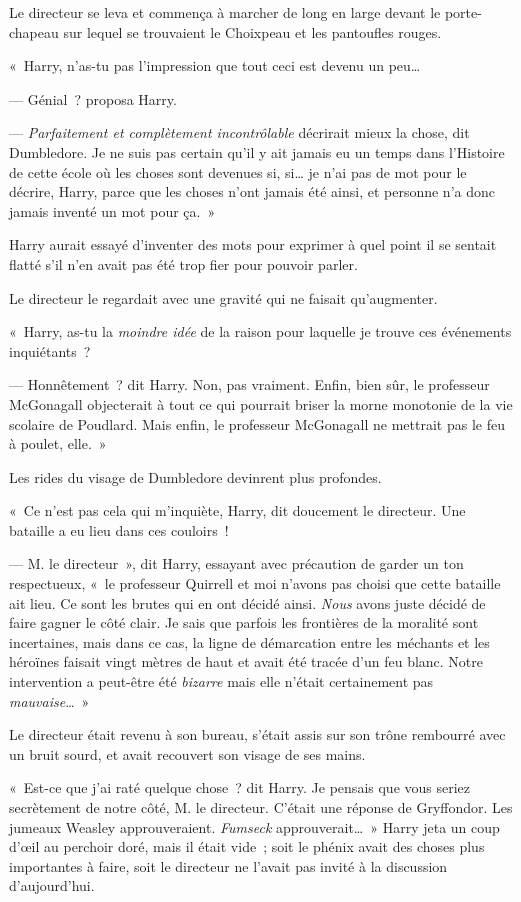 Le directeur se leva et commença à marcher de long en large devant le porte-chapeau sur lequel se trouvaient le Choixpeau et les pantoufles rouges.

«~Harry, n'as-tu pas l'impression que tout ceci est devenu un peu…

--- Génial~? proposa Harry.

--- \emph{Parfaitement et complètement incontrôlable} décrirait mieux la chose, dit Dumbledore.
Je ne suis pas certain qu'il y ait jamais eu un temps dans l'Histoire de cette école où les choses sont devenues si, si… je n'ai pas de mot pour le décrire, Harry, parce que les choses n'ont jamais été ainsi, et personne n'a donc jamais inventé un mot pour ça.~»

Harry aurait essayé d'inventer des mots pour exprimer à quel point il se sentait flatté s'il n'en avait pas été trop fier pour pouvoir parler.

Le directeur le regardait avec une gravité qui ne faisait qu'augmenter.

«~Harry, as-tu la \emph{moindre idée} de la raison pour laquelle je trouve ces événements inquiétants~?

--- Honnêtement~? dit Harry.
Non, pas vraiment.
Enfin, bien sûr, le professeur McGonagall objecterait à tout ce qui pourrait briser la morne monotonie de la vie scolaire de Poudlard.
Mais enfin, le professeur McGonagall ne mettrait pas le feu à poulet, elle.~»

Les rides du visage de Dumbledore devinrent plus profondes.

«~Ce n'est pas cela qui m'inquiète, Harry, dit doucement le directeur.
Une bataille a eu lieu dans ces couloirs~!

--- M. le directeur~», dit Harry, essayant avec précaution de garder un ton respectueux, «~le professeur Quirrell et moi n'avons pas choisi que cette bataille ait lieu.
Ce sont les brutes qui en ont décidé ainsi.
\emph{Nous} avons juste décidé de faire gagner le côté clair.
Je sais que parfois les frontières de la moralité sont incertaines, mais dans ce cas, la ligne de démarcation entre les méchants et les héroïnes faisait vingt mètres de haut et avait été tracée d'un feu blanc.
Notre intervention a peut-être été \emph{bizarre} mais elle n'était certainement pas \emph{mauvaise}…~»

Le directeur était revenu à son bureau, s'était assis sur son trône rembourré avec un bruit sourd, et avait recouvert son visage de ses mains.

«~Est-ce que j'ai raté quelque chose~? dit Harry.
Je pensais que vous seriez secrètement de notre côté, M. le directeur.
C'était une réponse de Gryffondor.
Les jumeaux Weasley approuveraient.
\emph{Fumseck} approuverait…~»
Harry jeta un coup d'œil au perchoir doré, mais il était vide~; soit le phénix avait des choses plus importantes à faire, soit le directeur ne l'avait pas invité à la discussion d'aujourd'hui.

